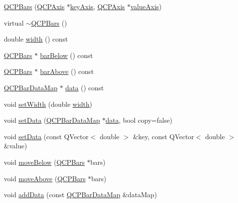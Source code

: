 \begin{DoxyCompactItemize}
\item 
\hyperlink{class_q_c_p_bars_a64006999ad9dff308f40df41cef176ad}{Q\-C\-P\-Bars} (\hyperlink{class_q_c_p_axis}{Q\-C\-P\-Axis} $\ast$\hyperlink{class_q_c_p_abstract_plottable_a72c7a09c22963f2c943f07112b311103}{key\-Axis}, \hyperlink{class_q_c_p_axis}{Q\-C\-P\-Axis} $\ast$\hyperlink{class_q_c_p_abstract_plottable_a3106f9d34d330a6097a8ec5905e5b519}{value\-Axis})
\item 
virtual \hyperlink{class_q_c_p_bars_a4d880e28031ef120603f543379be2f22}{$\sim$\-Q\-C\-P\-Bars} ()
\item 
double \hyperlink{class_q_c_p_bars_a42798c38abd5f5db22bd45d77f429625}{width} () const 
\item 
\hyperlink{class_q_c_p_bars}{Q\-C\-P\-Bars} $\ast$ \hyperlink{class_q_c_p_bars_a2c46a686cbad95f180ca3c2e88263961}{bar\-Below} () const 
\item 
\hyperlink{class_q_c_p_bars}{Q\-C\-P\-Bars} $\ast$ \hyperlink{class_q_c_p_bars_a9ca48a6577586825d85bdc1fbf410803}{bar\-Above} () const 
\item 
\hyperlink{qcustomplot_8h_aa846c77472cae93def9f1609d0c57191}{Q\-C\-P\-Bar\-Data\-Map} $\ast$ \hyperlink{class_q_c_p_bars_ac05c21de37f677545d06fd852ef8a743}{data} () const 
\item 
void \hyperlink{class_q_c_p_bars_afec6116579d44d5b706e0fa5e5332507}{set\-Width} (double \hyperlink{class_q_c_p_bars_a42798c38abd5f5db22bd45d77f429625}{width})
\item 
void \hyperlink{class_q_c_p_bars_aa3435aab19e0a49e4e7b41bd36a8d96b}{set\-Data} (\hyperlink{qcustomplot_8h_aa846c77472cae93def9f1609d0c57191}{Q\-C\-P\-Bar\-Data\-Map} $\ast$\hyperlink{class_q_c_p_bars_ac05c21de37f677545d06fd852ef8a743}{data}, bool copy=false)
\item 
void \hyperlink{class_q_c_p_bars_a3efded5df4a82ecb201f7c28099fa2e5}{set\-Data} (const Q\-Vector$<$ double $>$ \&key, const Q\-Vector$<$ double $>$ \&value)
\item 
void \hyperlink{class_q_c_p_bars_a69fc371346980f19177c3d1ecdad78ee}{move\-Below} (\hyperlink{class_q_c_p_bars}{Q\-C\-P\-Bars} $\ast$bars)
\item 
void \hyperlink{class_q_c_p_bars_ac22e00a6a41509538c21b04f0a57318c}{move\-Above} (\hyperlink{class_q_c_p_bars}{Q\-C\-P\-Bars} $\ast$bars)
\item 
void \hyperlink{class_q_c_p_bars_a1f29cf08615040993209147fa68de3f2}{add\-Data} (const \hyperlink{qcustomplot_8h_aa846c77472cae93def9f1609d0c57191}{Q\-C\-P\-Bar\-Data\-Map} \&data\-Map)

\end{DoxyCompactItemize}

